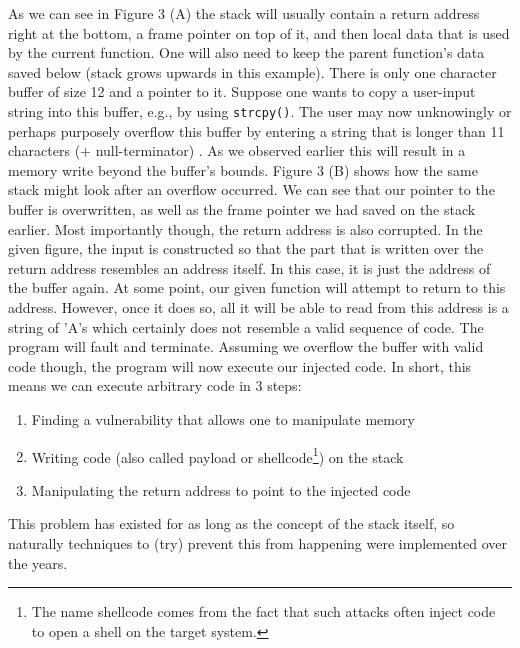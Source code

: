 \documentclass[10pt,twocolumn,a4paper]{article}
\begin{document}
\newline
As we can see in Figure 3 (A) the stack will usually contain a return address right at the bottom, a frame pointer on top of it, and then local data that is used by the current function.
One will also need to keep the parent function's data saved below (stack grows upwards in this example).
There is only one character buffer of size 12 and a pointer to it.
Suppose one wants to copy a user-input string into this buffer, e.g., by using \texttt{strcpy()}.
The user may now unknowingly or perhaps purposely overflow this buffer by entering a string that is longer than 11 characters (+ null-terminator) .
As we observed earlier this will result in a memory write beyond the buffer's bounds. 
Figure 3 (B) shows how the same stack might look after an overflow occurred. We can see that our pointer to the buffer is overwritten, as well as the frame pointer we had saved on the stack earlier.
Most importantly though, the return address is also corrupted.
In the given figure, the input is constructed so that the part that is written over the return address resembles an address itself.
In this case, it is just the address of the buffer again.
At some point, our given function will attempt to return to this address.
However, once it does so, all it will be able to read from this address is a string of 'A's which certainly does not resemble a valid sequence of code.
The program will fault and terminate.
Assuming we overflow the buffer with valid code though, the program will now execute our injected code. In short, this means we can execute arbitrary code in 3 steps:
\begin{enumerate}
	\item Finding a vulnerability that allows one to manipulate memory
	\item Writing code (also called payload or shellcode\footnote{The name shellcode comes from the fact that such attacks often inject code to open a shell on the target system.}) on the stack 
	\item Manipulating the return address to point to the injected code
\end{enumerate}
This problem has existed for as long as the concept of the stack itself, so naturally techniques to (try) prevent this from happening were implemented over the years.
\end{document}
